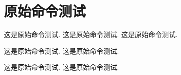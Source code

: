 \documentclass[a4paper,fontset = adobe]{ctexbook}
\begin{document}
\chapter{原始命令测试}


这是原始命令测试.
这是原始命令测试.
这是原始命令测试.

这是原始命令测试.
这是原始命令测试.

这是原始命令测试.
这是原始命令测试.
\end{document}
